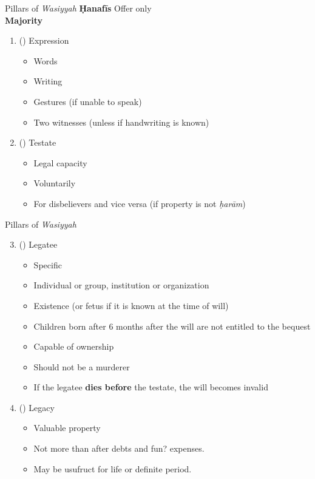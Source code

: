 \begin{frame}{Pillars of \textit{Wasiyyah}}
\textbf{Ḥanafīs} Offer only\\
\textbf{Majority}
\begin{enumerate}
\item ({}) Expression
\begin{itemize}
\item Words
\item Writing
\item Gestures (if unable to speak)
\item Two witnesses (unless if handwriting is known)
\end{itemize}
\item ({}) Testate
\begin{itemize}
\item Legal capacity
\item Voluntarily
\item For disbelievers and vice versa (if property is not \textit{ḥarām})
\end{itemize}
\end{enumerate}
\end{frame}

\begin{frame}{Pillars of \textit{Wasiyyah}}
\begin{enumerate}
\setcounter{enumi}{2}
\item ({}) Legatee
\begin{itemize}
\item Specific
\item Individual or group, institution or organization
\item Existence (or fetus if it is known at the time of will)
\item Children born after 6 months after the will are not entitled to the bequest
\item Capable of ownership
\item Should not be a murderer
\item If the legatee \textbf{dies before} the testate, the will becomes \alert{invalid}
\end{itemize}
\item ({}) Legacy
\begin{itemize}
\item Valuable property
\item Not more than  after debts and fun? expenses.
\item May be usufruct for life or definite period.
\end{itemize}
\end{enumerate}
\end{frame}

